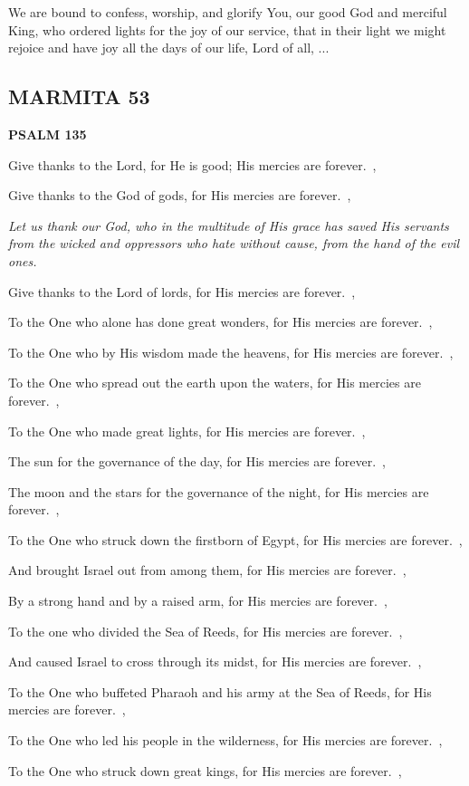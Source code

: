 \documentclass[12pt,twoside,a5paper]{article}
\newcommand{\marmita}[1]{\subsection*{MARMITA {#1}}}
\newcommand{\psalm}[1]{\textbf{PSALM {#1}}\nopagebreak}
\newcommand{\qanona}[1]{{\liturgicalhint{Qanona.} \emph{#1}}}
\newcommand{\slota}[1]{\liturgicalhint{Slota.} #1}
\begin{document}
\slota{We are bound to confess, worship, and glorify You, our good God and merciful King, who ordered lights for the joy of our service, that in their light we might rejoice and have joy all the days of our life, Lord of all, ...}

\marmita{53}

\psalm{135}

\begin{normalparskip}
  Give thanks to the Lord, for He is good; His mercies are forever.~\sep

  Give thanks to the God of gods, for His mercies are forever.~\sep

  \qanona{Let us thank our God, who in the multitude of His grace has saved His servants from the wicked and oppressors who hate without cause, from the hand of the evil ones.}

  Give thanks to the Lord of lords, for His mercies are forever.~\sep

  To the One who alone has done great wonders, for His mercies are forever.~\sep

  To the One who by His wisdom made the heavens, for His mercies are forever.~\sep

  To the One who spread out the earth upon the waters, for His mercies are forever.~\sep

  To the One who made great lights, for His mercies are forever.~\sep

  The sun for the governance of the day, for His mercies are forever.~\sep

  The moon and the stars for the governance of the night, for His mercies are forever.~\sep

  To the One who struck down the firstborn of Egypt, for His mercies are forever.~\sep

  And brought Israel out from among them, for His mercies are forever.~\sep

  By a strong hand and by a raised arm, for His mercies are forever.~\sep

  To the one who divided the Sea of Reeds, for His mercies are forever.~\sep

  And caused Israel to cross through its midst, for His mercies are forever.~\sep

  To the One who buffeted Pharaoh and his army at the Sea of Reeds, for His mercies are forever.~\sep

  To the One who led his people in the wilderness, for His mercies are forever.~\sep

  To the One who struck down great kings, for His mercies are forever.~\sep


\end{normalparskip}
\end{document}
